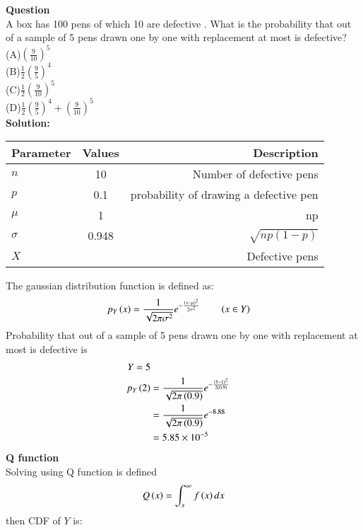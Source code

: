 \documentclass[journal,12pt,onecolumn]{IEEEtran}
\newcommand{\solution}{\noindent \textbf{Solution: }}
\providecommand{\qfunc}[1]{\ensuremath{Q\left(#1\right)}}
\providecommand{\qfunc}[1]{\ensuremath{Q\left(#1\right)}}
\begin{document}
\textbf{Question }\\
A box has 100 pens of which 10 are defective . What is the probability that out of a sample of 5 pens drawn one by one with replacement at most is defective?\\
(A)$\left(\frac{9}{10}\right)^5$\\
(B)$\frac{1}{2}\left(\frac{9}{5}\right)^4$\\
(C)$\frac{1}{2}\left(\frac{9}{10}\right)^5$\\
(D)$\frac{1}{2}\left(\frac{9}{5}\right)^4+\left(\frac{9}{10}\right)^5 $\\
\solution\\
\begin{table}[!ht]
\centering
\begin{tabular}{|l|c|r|}
    \hline
    Parameter & Values & Description\\
    \hline
    $n$ & 10 & Number of defective pens \\
    \hline
    $p$ & 0.1 &probability of drawing a defective pen \\
    \hline
    $\mu$ & 1 & np \\
    \hline
    $\sigma $ & 0.948 & $\sqrt{np(1-p)} $\\
    \hline
    $ X $ &  &  Defective pens \\
    \hline
\end{tabular}
\label{tab:gaussian/9/3/33}
\end{table}
The gaussian distribution function is defined as:
\begin{align}
p_Y\left(x\right) &= \frac{1}{\sqrt{2\pi{\sigma}^2}} e^{-\frac{\left(x-\mu\right)^2}{2{\sigma}^2}}\label{9.3.8} \qquad \left(x \in Y\right)
\end{align}
Probability that out of a sample of 5 pens drawn one by one with replacement at most is defective is\\
\begin{align} 
 Y = 5\\
p_Y\left(2\right) &= \frac{1}{\sqrt{2\pi\left(0.9\right)}} e^{-\frac{\left(5 - 1\right)^2}{2\left(0.9\right)}}\\
		  &= \frac{1}{\sqrt{2\pi\left(0.9\right)}} e^{-8.88}\\
	          &=  5.85\times 10^{-5}  
\end{align}
\textbf{Q function}\\
Solving using Q function is defined
\begin{align}
	\qfunc{x}=\int_x^{\infty}f\brak{x}dx
\end{align}
then CDF of $Y$ is:
\end{document}
